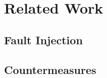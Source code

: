\section{Related Work}\label{sub:faultCounter}
\subsection{Fault Injection}
\subsection{Countermeasures}\label{subsec:countermeasures}



